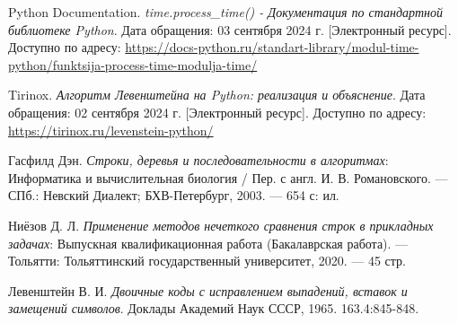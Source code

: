 \documentclass[a4paper,12pt]{article}
\begin{document}
\begin{thebibliography}{9}
     Python Documentation. \textit{time.process\_time() - Документация по стандартной библиотеке Python}. Дата обращения: 03 сентября 2024 г. [Электронный ресурс]. Доступно по адресу: \url{https://docs-python.ru/standart-library/modul-time-python/funktsija-process-time-modulja-time/}
    
     Tirinox. \textit{Алгоритм Левенштейна на Python: реализация и объяснение}. Дата обращения: 02 сентября 2024 г. [Электронный ресурс]. Доступно по адресу: \url{https://tirinox.ru/levenstein-python/}
    
     Гасфилд Дэн. \textit{Строки, деревья и последовательности в алгоритмах}: Информатика и вычислительная биология / Пер. с англ. И. В. Романовского. — СПб.: Невский Диалект; БХВ-Петербург, 2003. — 654 с: ил.
    
     Ниёзов Д. Л. \textit{Применение методов нечеткого сравнения строк в прикладных задачах}: Выпускная квалификационная работа (Бакалаврская работа). — Тольятти: Тольяттинский государственный университет, 2020. — 45 стр.
    
     Левенштейн В. И. \textit{Двоичные коды с исправлением выпадений, вставок и замещений символов}. Доклады Академий Наук СССР, 1965. 163.4:845-848.
\end{thebibliography}
\end{document}
